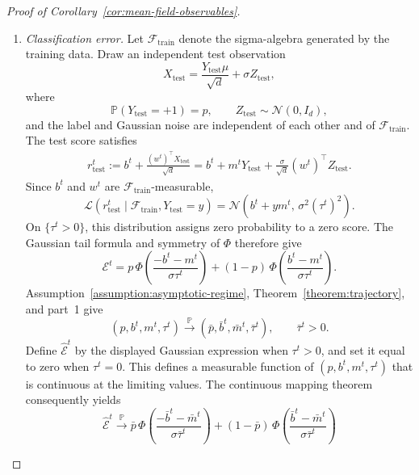\begin{proof}[Proof of Corollary~\ref{cor:mean-field-observables}]
\begin{enumerate}[wide]
    \item \emph{Classification error.}
    Let $\mathcal F_{\mathrm{train}}$ denote the
    sigma-algebra generated by the training data.
    Draw an independent test observation
    \[
        X_{\mathrm{test}}
        =
        \frac{Y_{\mathrm{test}}\mu}{\sqrt d}
        +\sigma Z_{\mathrm{test}},
    \]
    where
    \[
        \mathbb P(Y_{\mathrm{test}}=+1)=p,
        \qquad
        Z_{\mathrm{test}}\sim\mathcal N(0,I_d),
    \]
    and the label and Gaussian noise are independent
    of each other and of $\mathcal F_{\mathrm{train}}$.
    The test score satisfies
    \[
    \begin{aligned}
        r_{\mathrm{test}}^t
        :=
        b^t+\frac{(w^t)^\top X_{\mathrm{test}}}{\sqrt d}
        =
        b^t+m^tY_{\mathrm{test}}
        +\frac{\sigma}{\sqrt d}
            (w^t)^\top Z_{\mathrm{test}}.
    \end{aligned}
    \]
    Since $b^t$ and $w^t$ are
    $\mathcal F_{\mathrm{train}}$-measurable,
    \[
        \mathscr L\left(
            r_{\mathrm{test}}^t
            \mid\mathcal F_{\mathrm{train}},
                Y_{\mathrm{test}}=y
        \right)
        =
        \mathcal N\left(
            b^t+ym^t,\,
            \sigma^2(\tau^t)^2
        \right).
    \]
    On $\{\tau^t>0\}$, this distribution assigns zero
    probability to a zero score.
    The Gaussian tail formula and symmetry of $\Phi$
    therefore give
    \[
        \mathcal E^t
        =
        p\,\Phi\left(
            \frac{-b^t-m^t}{\sigma\tau^t}
        \right)
        +
        (1-p)\,\Phi\left(
            \frac{b^t-m^t}{\sigma\tau^t}
        \right).
    \]
    Assumption~\ref{assumption:asymptotic-regime},
    Theorem~\ref{theorem:trajectory}, and part~1 give
    \[
        (p,b^t,m^t,\tau^t)
        \xrightarrow{\mathbb P}
        (\bar p,\bar b^t,\bar m^t,\bar\tau^t),
        \qquad
        \bar\tau^t>0.
    \]
    Define $\widehat{\mathcal E}^t$ by the displayed
    Gaussian expression when $\tau^t>0$, and set it
    equal to zero when $\tau^t=0$.
    This defines a measurable function of
    $(p,b^t,m^t,\tau^t)$ that is continuous at the
    limiting values.
    The continuous mapping theorem
    \cite[Lemmas~5.3--5.4]{kallenberg2021foundations}
    consequently yields
    \[
        \widehat{\mathcal E}^t
        \xrightarrow{\mathbb P}
        \bar p\,\Phi\left(
            \frac{-\bar b^t-\bar m^t}{\sigma\bar\tau^t}
        \right)
        +
        (1-\bar p)\,\Phi\left(
            \frac{\bar b^t-\bar m^t}{\sigma\bar\tau^t}
        \right)
\]
\end{enumerate}
\end{proof}

